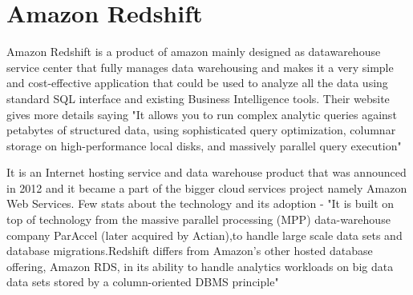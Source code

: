 \section{Amazon Redshift}

Amazon Redshift is a product of amazon mainly designed as datawarehouse service 
center that fully manages data warehousing and makes it a very simple and 
cost-effective application that could be used to analyze all the data using 
standard SQL interface and existing Business Intelligence tools. 
Their website gives more details saying "It allows you to run complex 
analytic queries against petabytes of structured data, using sophisticated 
query optimization, columnar storage on high-performance local disks, and 
massively parallel query execution" \cite{Amazon Redshift}

It is an Internet hosting service and data warehouse product that was 
announced in 2012 and it became a part of the bigger cloud services 
project namely Amazon Web Services. Few stats about the technology and its adoption -
"It is built on top of technology from the massive parallel processing (MPP) 
data-warehouse company ParAccel (later acquired by Actian),to handle large 
scale data sets and database migrations.Redshift differs from Amazon's other hosted database offering, 
Amazon RDS, in its ability to handle analytics workloads on big data data sets 
stored by a column-oriented DBMS principle" \cite{AmazonWiki}

